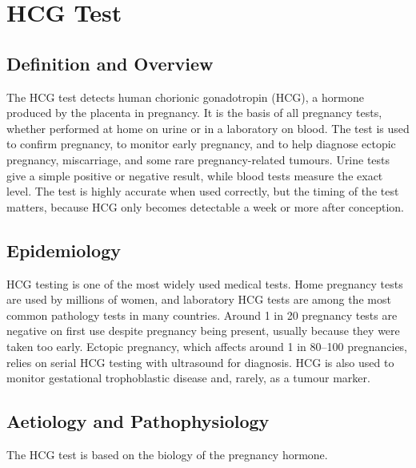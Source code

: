\chapter{HCG Test}

\section*{Definition and Overview}
The HCG test detects human chorionic gonadotropin (HCG), a hormone produced by the placenta in pregnancy. It is the basis of all pregnancy tests, whether performed at home on urine or in a laboratory on blood. The test is used to confirm pregnancy, to monitor early pregnancy, and to help diagnose ectopic pregnancy, miscarriage, and some rare pregnancy-related tumours. Urine tests give a simple positive or negative result, while blood tests measure the exact level. The test is highly accurate when used correctly, but the timing of the test matters, because HCG only becomes detectable a week or more after conception.

\section*{Epidemiology}
HCG testing is one of the most widely used medical tests. Home pregnancy tests are used by millions of women, and laboratory HCG tests are among the most common pathology tests in many countries. Around 1 in 20 pregnancy tests are negative on first use despite pregnancy being present, usually because they were taken too early. Ectopic pregnancy, which affects around 1 in 80--100 pregnancies, relies on serial HCG testing with ultrasound for diagnosis. HCG is also used to monitor gestational trophoblastic disease and, rarely, as a tumour marker.

\section*{Aetiology and Pathophysiology}
The HCG test is based on the biology of the pregnancy hormone.

